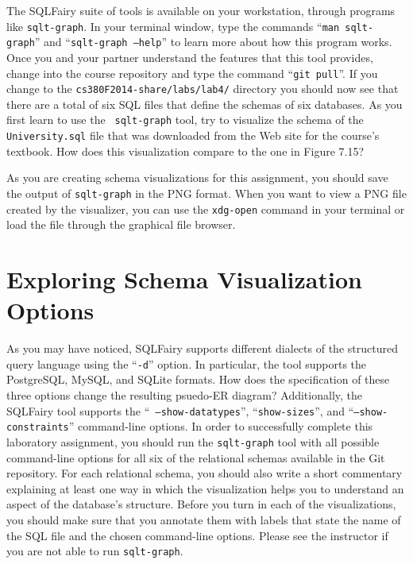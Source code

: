 The SQLFairy suite of tools is available on your workstation, through programs like {\tt sqlt-graph}.  In your terminal
window, type the commands ``{\tt man sqlt-graph}'' and ``{\tt sqlt-graph --help}'' to learn more about how this program
works. Once you and your partner understand the features that this tool provides, change into the course repository and
type the command ``{\tt git pull}''. If you change to the {\tt cs380F2014-share/labs/lab4/} directory you should now see
that there are a total of six SQL files that define the schemas of six databases. As you first learn to use the {\tt
  sqlt-graph} tool, try to visualize the schema of the {\tt University.sql} file that was downloaded from the Web site
for the course's textbook. How does this visualization compare to the one in Figure 7.15? 

As you are creating schema visualizations for this assignment, you should save the output of {\tt sqlt-graph} in the PNG
format.  When you want to view a PNG file created by the visualizer, you can use the {\tt xdg-open} command in your
terminal or load the file through the graphical file browser.

\vspace*{-.05in}
\section*{Exploring Schema Visualization Options}

As you may have noticed, SQLFairy supports different dialects of the structured query language using the ``{\tt -d}''
option.  In particular, the tool supports the PostgreSQL, MySQL, and SQLite formats.  How does the specification of
these three options change the resulting psuedo-ER diagram? Additionally, the SQLFairy tool supports the ``{\tt
  --show-datatypes}'', ``{\tt show-sizes}'', and ``{\tt --show-constraints}'' command-line options.  In order to
successfully complete this laboratory assignment, you should run the {\tt sqlt-graph} tool with all possible
command-line options for all six of the relational schemas available in the Git repository. For each relational schema,
you should also write a short commentary explaining at least one way in which the visualization helps you to understand
an aspect of the database's structure. Before you turn in each of the visualizations, you should make sure that you
annotate them with labels that state the name of the SQL file and the chosen command-line options. Please see the
instructor if you are not able to run {\tt sqlt-graph}.

